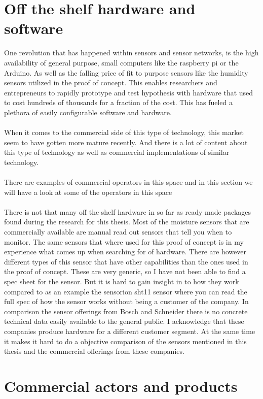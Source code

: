 \documentclass[]{uiophd}
\begin{document}
\section{Off the shelf hardware and software}
One revolution that has happened within sensors and sensor networks, is the high availability of general purpose, small computers like the raspberry pi or the Arduino. As well as the falling price of fit to purpose sensors like the humidity sensors utilized in the proof of concept. This enables researchers and entrepreneurs to rapidly prototype and test hypothesis with hardware that used to cost hundreds of thousands for a fraction of the cost. This has fueled a plethora of easily configurable software and hardware.
\\\\
When it comes to the commercial side of this type of technology, this market seem to have gotten more mature recently. And there is a lot of content about this type of technology as well as commercial implementations of similar technology.
\\\\
There are examples of commercial operators in this space and in this section we will have a look at some of the operators in this space
\\\\
There is not that many off the shelf hardware in so far as ready made packages  found during the research for this thesis. Most of the moisture sensors that are commercially available are manual read out sensors that tell you when to monitor. The same sensors that where used for this proof of concept is in my experience what comes up when searching for  of hardware. There are however different types of this sensor that have other capabilities than the ones used in the proof of concept. These are very generic, so I have not been able to find a spec sheet for the sensor. But it is hard to gain insight in to how they work compared to as an example the sensorion sht11 sensor\cite{sensorion} where you can read the full spec of how the sensor works without being a customer of the company. In comparison the sensor offerings from Bosch and Schneider there is no concrete technical data easily available to the general public. I acknowledge that these companies produce hardware for a different customer segment. At the same time it makes it hard to do a objective comparison of the sensors mentioned in this thesis and the commercial offerings from these companies.

\section{Commercial actors and products}
\end{document}
